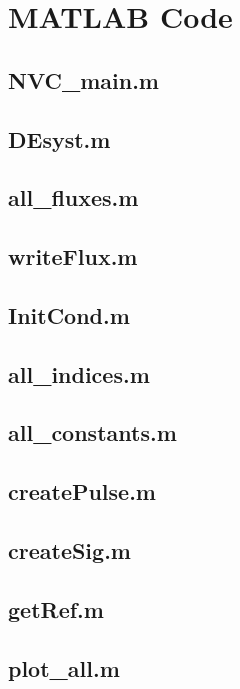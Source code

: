 \section{MATLAB Code}

\subsection*{NVC\_main.m}
    
\newpage
\subsection*{DEsyst.m}
    
\newpage
\subsection*{all\_fluxes.m}
    
\newpage
\subsection*{writeFlux.m}
    
\newpage
\subsection*{InitCond.m}
    
\newpage
\subsection*{all\_indices.m}
    
\newpage
\subsection*{all\_constants.m}
    
\newpage
\subsection*{createPulse.m}
    
\newpage
\subsection*{createSig.m}
    
\newpage
\subsection*{getRef.m}
    
\newpage
\subsection*{plot\_all.m}
    
